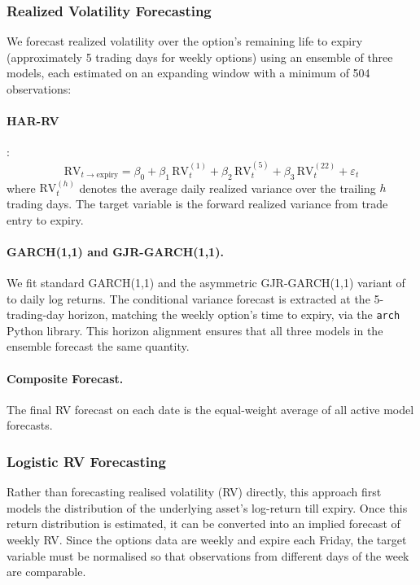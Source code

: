\documentclass[11pt,a4paper]{article}
\begin{document}
\subsubsection{Realized Volatility Forecasting}

We forecast realized volatility over the option's remaining life to expiry (approximately 5 trading days for weekly options) using an ensemble of three models, each estimated on an expanding window with a minimum of 504 observations:

\paragraph{HAR-RV} \citep{corsi2009simple}:
\begin{equation}
    \text{RV}_{t \to \text{expiry}} = \beta_0 + \beta_1\, \text{RV}_t^{(1)} + \beta_2\, \text{RV}_t^{(5)} + \beta_3\, \text{RV}_t^{(22)} + \varepsilon_t
\end{equation}
where $\text{RV}_t^{(h)}$ denotes the average daily realized variance over the trailing $h$ trading days.
The target variable is the forward realized variance from trade entry to expiry.

\paragraph{GARCH(1,1) and GJR-GARCH(1,1).}
We fit standard GARCH(1,1) and the asymmetric GJR-GARCH(1,1) variant of \citet{hansen2012realized} to daily log returns.
The conditional variance forecast is extracted at the 5-trading-day horizon, matching the weekly option's time to expiry, via the \texttt{arch} Python library.
This horizon alignment ensures that all three models in the ensemble forecast the same quantity.

\paragraph{Composite Forecast.}
The final RV forecast on each date is the equal-weight average of all active model forecasts.

\subsubsection{Logistic RV Forecasting}

Rather than forecasting realised volatility (RV) directly, this approach first models the distribution of the underlying asset's log-return till expiry. Once this return distribution is estimated, it can be converted into an implied forecast of weekly RV. Since the options data are weekly and expire each Friday, the target variable must be normalised so that observations from different days of the week are comparable.
\end{document}
